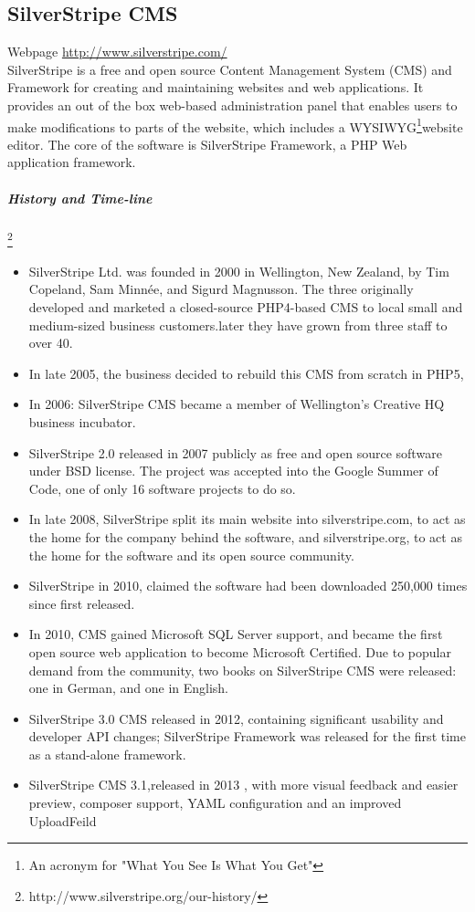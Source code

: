 \documentclass[11pt]{article} %
\begin{document}

\subsection{SilverStripe CMS} 
Webpage \url{http://www.silverstripe.com/}\\
   SilverStripe is a free and open source Content Management System (CMS) and Framework for creating and maintaining websites and web applications. It provides an out of the box web-based administration panel that enables users to make modifications to parts of the website, which includes a WYSIWYG\footnote{ An acronym for "What You See Is What You Get"}website editor. The core of the software is SilverStripe Framework, a PHP Web application framework.
  
  \subparagraph{History and Time-line}\footnote{http://www.silverstripe.org/our-history/}
\begin{itemize}
\item SilverStripe Ltd. was founded in 2000 in Wellington, New Zealand, by Tim Copeland, Sam Minnée, and Sigurd Magnusson. The three originally developed and marketed a closed-source PHP4-based CMS to local small and medium-sized business customers.later they have grown from three staff to over 40.
\item In late 2005, the business decided to rebuild this CMS from scratch in PHP5,
\item In 2006: SilverStripe CMS became a member of Wellington’s Creative HQ business incubator.
\item SilverStripe 2.0 released in 2007 publicly as free and open source software under BSD license. The project was accepted into the Google Summer of Code, one of only 16 software projects to do so.
\item In late 2008, SilverStripe split its main website into silverstripe.com, to act as the home for the company behind the software, and silverstripe.org, to act as the home for the software and its open source community.
\item SilverStripe in 2010, claimed the software had been downloaded 250,000 times since first released.
\item In 2010, CMS gained Microsoft SQL Server support, and became the first open source web application to become Microsoft Certified. Due to popular demand from the community, two books on SilverStripe CMS were released: one in German, and one in English.

\item SilverStripe 3.0 CMS released in 2012, containing significant usability and developer API changes; SilverStripe Framework was released for the first time as a stand-alone framework.
\item SilverStripe CMS 3.1,released in 2013 , with more visual feedback and easier preview, composer support, YAML configuration and an improved UploadFeild


\end{itemize}
\end{document}
